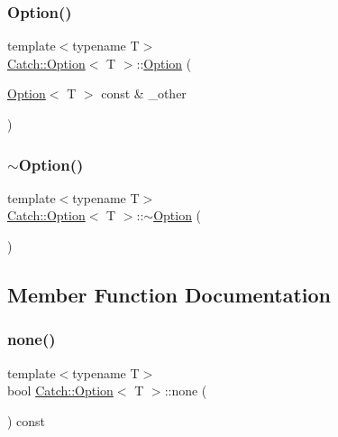 \subsubsection{\texorpdfstring{Option()}{Option()}\hspace{0.1cm}{\footnotesize\ttfamily [3/3]}}
{\footnotesize\ttfamily template$<$typename T$>$ \\
\hyperlink{class_catch_1_1_option}{Catch\+::\+Option}$<$ T $>$\+::\hyperlink{class_catch_1_1_option}{Option} (\begin{DoxyParamCaption}\item[{\hyperlink{class_catch_1_1_option}{Option}$<$ T $>$ const \&}]{\+\_\+other }\end{DoxyParamCaption})\hspace{0.3cm}{\ttfamily [inline]}}

\hypertarget{class_catch_1_1_option_a37fe90bb47bb909f150a5ad6be25581a}{}\label{class_catch_1_1_option_a37fe90bb47bb909f150a5ad6be25581a} 
\subsubsection{\texorpdfstring{$\sim$\+Option()}{~Option()}}
{\footnotesize\ttfamily template$<$typename T$>$ \\
\hyperlink{class_catch_1_1_option}{Catch\+::\+Option}$<$ T $>$\+::$\sim$\hyperlink{class_catch_1_1_option}{Option} (\begin{DoxyParamCaption}{ }\end{DoxyParamCaption})\hspace{0.3cm}{\ttfamily [inline]}}



\subsection{Member Function Documentation}
\hypertarget{class_catch_1_1_option_a821753afdc3fac947a13a01fbe0d248e}{}\label{class_catch_1_1_option_a821753afdc3fac947a13a01fbe0d248e} 
\subsubsection{\texorpdfstring{none()}{none()}}
{\footnotesize\ttfamily template$<$typename T$>$ \\
bool \hyperlink{class_catch_1_1_option}{Catch\+::\+Option}$<$ T $>$\+::none (\begin{DoxyParamCaption}{ }\end{DoxyParamCaption}) const\hspace{0.3cm}{\ttfamily [inline]}}

